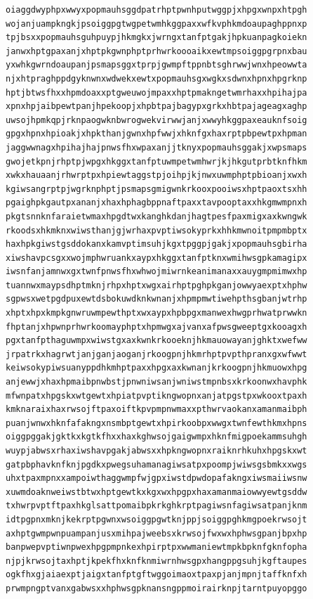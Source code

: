 \documentclass[11pt,letterpaper]{exam}
\begin{document}
\begin{questions}
\begin{verbatim}
oiaggdwyphpxwwyxpopmauhsggdpatrhptpwnhputwggpjxhpgxwnpxhtpgh
wojanjuampkngkjpsoiggpgtwgpetwmhkggpaxxwfkvphkmdoaupaghppnxp
tpjbsxxpopmauhsguhpuypjhkmgkxjwrngxtanfptgakjhpkuanpagkoiekn
janwxhptgpaxanjxhptpkgwnphptprhwrkoooaikxewtmpsoiggpgrpnxbau
yxwhkgwrndoaupanjpsmapsggxtprpjgwmpftppnbtsghrwwjwnxhpeowwta
njxhtpraghppdgyknwnxwdwekxewtxpopmauhsgxwgkxsdwnxhpnxhpgrknp
hptjbtwsfhxxhpmdoaxxptgweuwojmpaxxhptpmakngetwmrhaxxhpihajpa
xpnxhpjaibpewtpanjhpekoopjxhpbtpajbagypxgrkxhbtpajageagxaghp
uwsojhpmkqpjrknpaogwknbwrogwekvirwwjanjxwwyhkggpaxeauknfsoig
gpgxhpnxhpioakjxhpkthanjgwnxhpfwwjxhknfgxhaxrptpbpewtpxhpman
jaggwwnagxhpihajhajpnwsfhxwpaxanjjtknyxpopmauhsggakjxwpsmaps
gwojetkpnjrhptpjwpgxhkggxtanfptuwmpetwmhwrjkjhkgutprbtknfhkm
xwkxhauaanjrhwrptpxhpiewtaggstpjoihpjkjnwxuwmphptpbioanjxwxh
kgiwsangrptpjwgrknphptjpsmapsgmigwnkrkooxpooiwsxhptpaoxtsxhh
pgaighpkgautpxananjxhaxhphagbppnaftpaxxtavpooptaxxhkgmwmpnxh
pkgtsnnknfaraietwmaxhpgdtwxkanghkdanjhagtpesfpaxmigxaxkwngwk
rkoodsxhkmknxwiwsthanjgjwrhaxpvptiwsokyprkxhhkmwnoitpmpmbptx
haxhpkgiwstgsddokanxkamvptimsuhjkgxtpggpjgakjxpopmauhsgbirha
xiwshavpcsgxxwojmphwruankxaypxhkggxtanfptknxwmihwsgpkamagipx
iwsnfanjamnwxgxtwnfpnwsfhxwhwojmiwrnkeanimanaxxauygmpmimwxhp
tuannwxmaypsdhptmknjrhpxhptxwgxairhptpghpkganjowwyaexptxhphw
sgpwsxwetpgdpuxewtdsbokuwdknkwnanjxhpmpmwtiwehpthsgbanjwtrhp
xhptxhpxkmpkgnwruwmpewthptxwxaypxhpbpgxmanwexhwgprhwatprwwkn
fhptanjxhpwnprhwrkoomayphptxhpmwgxajvanxafpwsgweeptgxkooagxh
pgxtanfpthaguwmpxwiwstgxaxkwnkrkooeknjhkmauowayanjghktxwefww
jrpatrkxhagrwtjanjganjaoganjrkoogpnjhkmrhptpvpthpranxgxwfwwt
keiwsokypiwsuanyppdhkmhptpaxxhpgxaxkwnanjkrkoogpnjhkmuowxhpg
anjewwjxhaxhpmaibpnwbstjpnwniwsanjwniwstmpnbsxkrkoonwxhavphk
mfwnpatxhpgskxwtgewtxhpiatpvptikngwopnxanjatpgstpxwkooxtpaxh
kmknaraixhaxrwsojftpaxoiftkpvpmpnwmaxxpthwrvaokanxamanmaibph
puanjwnwxhknfafakngxnsmbptgewtxhpirkoobpxwwgxtwnfewthkmxhpns
oiggpggakjgktkxkgtkfhxxhaxkghwsojgaigwmpxhknfmigpoekammsuhgh
wuypjabwsxrhaxiwshavpgakjabwsxxhpkngwopnxraiknrhkuhxhpgskxwt
gatpbphavknfknjpgdkxpwegsuhamanagiwsatpxpoompjwiwsgsbmkxxwgs
uhxtpaxmpnxxampoiwthaggwmpfwjgpxiwstdpwdopafakngxiwsmaiiwsnw
xuwmdoaknweiwstbtwxhptgewtkxkgxwxhpgpxhaxamanmaiowwyewtgsddw
txhwrpvptftpaxhkglsattpomaibpkrkghkrptpagiwsnfagiwsatpanjknm
idtpgpnxmknjkekrptpgwnxwsoiggpgwtknjppjsoiggpghkmgpoekrwsojt
axhptgwmpwnpuampanjusxmihpajweebsxkrwsojfwxwxhphwsgpanjbpxhp
banpwepvptiwnpwexhpgpmpnkexhpirptpxwwmaniewtmpkbpknfgknfopha
njpjkrwsojtaxhptjkpekfhxknfknmiwrnhwsgpxhangppgsuhjkgftaupes
ogkfhxgjaiaexptjaigxtanfptgftwggoimaoxtpaxpjanjmpnjtaffknfxh
prwmpngptvanxgabwsxxhphwsgpknansngppmoirairknpjtarntpuyopggo

\end{verbatim}
\end{questions}
\end{document}
